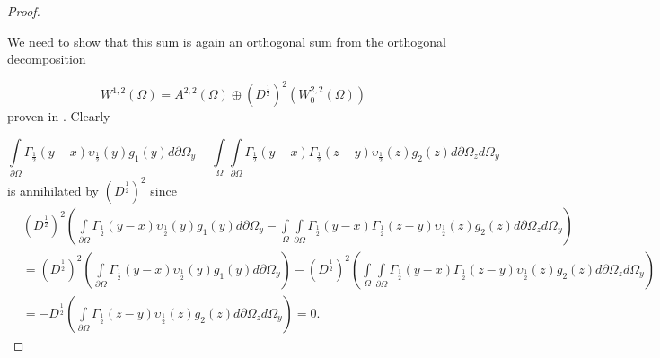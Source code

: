 \documentclass{amsart}%
\theoremstyle{plain}
\numberwithin{equation}{section}
\begin{document}
\begin{proof}
\ \ 

We need to show that this sum is again an orthogonal sum from the orthogonal decomposition%

\[
W^{1,2}\left(  \Omega\right)  =A^{2,2}\left(  \Omega\right)  \oplus\left(
D^{\frac{1}{2}}\right)  ^{2}\left(  W_{0}^{2,2}\left(  \Omega\right)  \right)
\]
proven in \cite{dlakew1}. Clearly \ \ %

\[%
{\displaystyle\int\limits_{\partial\Omega}}
\Gamma_{\frac{1}{2}}\left(  y-x\right)  \upsilon_{\frac{1}{2}}\left(
y\right)  g_{1}\left(  y\right)  d\partial\Omega_{y}-%
{\displaystyle\int\limits_{\Omega}}
{\displaystyle\int\limits_{\partial\Omega}}
\Gamma_{\frac{1}{2}}\left(  y-x\right)  \Gamma_{\frac{1}{2}}\left(
z-y\right)  \upsilon_{\frac{1}{2}}\left(  z\right)  g_{2}(z)d\partial
\Omega_{z}d\Omega_{y}%
\]
is annihilated by $\left(  D^{\frac{1}{2}}\right)  ^{2}$ since \
\begin{align*}
& \left(  D^{\frac{1}{2}}\right)  ^{2}\left(
{\displaystyle\int\limits_{\partial\Omega}}
\Gamma_{\frac{1}{2}}\left(  y-x\right)  \upsilon_{\frac{1}{2}}\left(
y\right)  g_{1}\left(  y\right)  d\partial\Omega_{y}-%
{\displaystyle\int\limits_{\Omega}}
{\displaystyle\int\limits_{\partial\Omega}}
\Gamma_{\frac{1}{2}}\left(  y-x\right)  \Gamma_{\frac{1}{2}}\left(
z-y\right)  \upsilon_{\frac{1}{2}}\left(  z\right)  g_{2}(z)d\partial
\Omega_{z}d\Omega_{y}\right) \\
& =\left(  D^{\frac{1}{2}}\right)  ^{2}\left(
{\displaystyle\int\limits_{\partial\Omega}}
\Gamma_{\frac{1}{2}}\left(  y-x\right)  \upsilon_{\frac{1}{2}}\left(
y\right)  g_{1}\left(  y\right)  d\partial\Omega_{y}\right)  -\left(
D^{\frac{1}{2}}\right)  ^{2}\left(
{\displaystyle\int\limits_{\Omega}}
{\displaystyle\int\limits_{\partial\Omega}}
\Gamma_{\frac{1}{2}}\left(  y-x\right)  \Gamma_{\frac{1}{2}}\left(
z-y\right)  \upsilon_{\frac{1}{2}}\left(  z\right)  g_{2}(z)d\partial
\Omega_{z}d\Omega_{y}\right) \\
& =-D^{\frac{1}{2}}\left(
{\displaystyle\int\limits_{\partial\Omega}}
\Gamma_{\frac{1}{2}}\left(  z-y\right)  \upsilon_{\frac{1}{2}}\left(
z\right)  g_{2}(z)d\partial\Omega_{z}d\Omega_{y}\right)  =0\text{.}%
\end{align*}



\end{proof}
\end{document}
